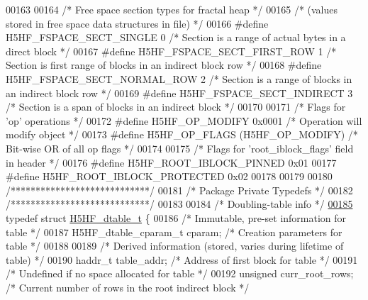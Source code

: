 \begin{DoxyCode}
00163 
00164 \textcolor{comment}{/* Free space section types for fractal heap */}
00165 \textcolor{comment}{/* (values stored in free space data structures in file) */}
00166 \textcolor{preprocessor}{#define H5HF\_FSPACE\_SECT\_SINGLE         0       }\textcolor{comment}{/* Section is a range of actual bytes in a direct block */}\textcolor{preprocessor}{}
00167 \textcolor{preprocessor}{#define H5HF\_FSPACE\_SECT\_FIRST\_ROW      1       }\textcolor{comment}{/* Section is first range of blocks in an indirect block
       row */}\textcolor{preprocessor}{}
00168 \textcolor{preprocessor}{#define H5HF\_FSPACE\_SECT\_NORMAL\_ROW     2       }\textcolor{comment}{/* Section is a range of blocks in an indirect block row */}\textcolor{preprocessor}{}
00169 \textcolor{preprocessor}{#define H5HF\_FSPACE\_SECT\_INDIRECT       3       }\textcolor{comment}{/* Section is a span of blocks in an indirect block */}\textcolor{preprocessor}{}
00170 
00171 \textcolor{comment}{/* Flags for 'op' operations */}
00172 \textcolor{preprocessor}{#define H5HF\_OP\_MODIFY          0x0001          }\textcolor{comment}{/* Operation will modify object */}\textcolor{preprocessor}{}
00173 \textcolor{preprocessor}{#define H5HF\_OP\_FLAGS           (H5HF\_OP\_MODIFY)        }\textcolor{comment}{/* Bit-wise OR of all op flags */}\textcolor{preprocessor}{}
00174 
00175 \textcolor{comment}{/* Flags for 'root\_iblock\_flags' field in header */}
00176 \textcolor{preprocessor}{#define H5HF\_ROOT\_IBLOCK\_PINNED         0x01}
00177 \textcolor{preprocessor}{#define H5HF\_ROOT\_IBLOCK\_PROTECTED      0x02}
00178 
00179 
00180 \textcolor{comment}{/****************************/}
00181 \textcolor{comment}{/* Package Private Typedefs */}
00182 \textcolor{comment}{/****************************/}
00183 
00184 \textcolor{comment}{/* Doubling-table info */}
\hyperlink{struct_h5_h_f__dtable__t}{00185} \textcolor{keyword}{typedef} \textcolor{keyword}{struct }\hyperlink{struct_h5_h_f__dtable__t}{H5HF\_dtable\_t} \{
00186     \textcolor{comment}{/* Immutable, pre-set information for table */}
00187     H5HF\_dtable\_cparam\_t    cparam;     \textcolor{comment}{/* Creation parameters for table */}
00188 
00189     \textcolor{comment}{/* Derived information (stored, varies during lifetime of table) */}
00190     haddr\_t     table\_addr;     \textcolor{comment}{/* Address of first block for table */}
00191                                 \textcolor{comment}{/* Undefined if no space allocated for table */}
00192     \textcolor{keywordtype}{unsigned}    curr\_root\_rows; \textcolor{comment}{/* Current number of rows in the root indirect block */}

\end{DoxyCode}
